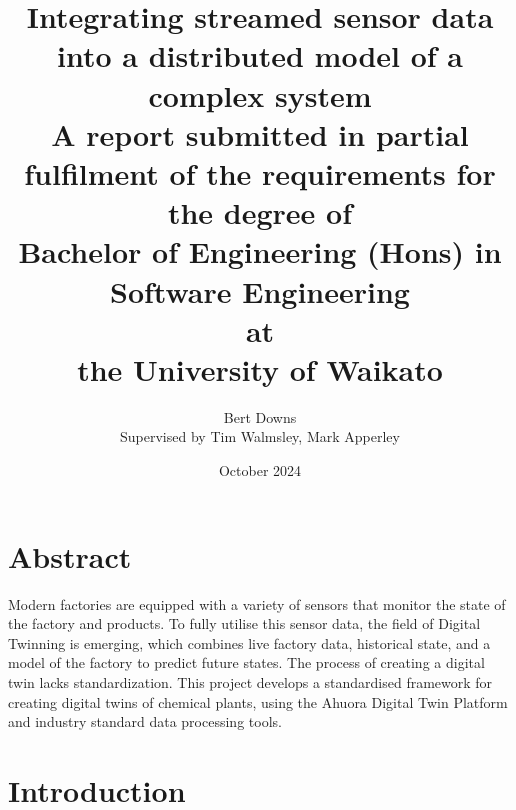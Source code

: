 \documentclass[12pt]{book}
\title{Integrating streamed sensor data into a distributed model of a complex system \\
\large{A report submitted in partial fulfilment of the requirements for the degree of \\
\textbf{Bachelor of Engineering (Hons) in Software Engineering} \\
at \\
\textbf{the University of Waikato}
}}
\author{Bert Downs  \\ 
Supervised by Tim Walmsley, Mark Apperley }
\date{October 2024}
\begin{document}
\maketitle


\chapter*{Abstract}

Modern factories are equipped with a variety of sensors that monitor the state of the factory and products. To fully utilise this sensor data, the field of Digital Twinning is emerging, which combines live factory data, historical state, and a model of the factory to predict future states. The process of creating a digital twin lacks standardization. This project develops a standardised framework for creating digital twins of chemical plants, using the Ahuora Digital Twin Platform and industry standard data processing tools.  


\tableofcontents



\newpage




\chapter{Introduction}




\begin{appendices}





% 

%     


% 

\end{appendices}
\end{document}

